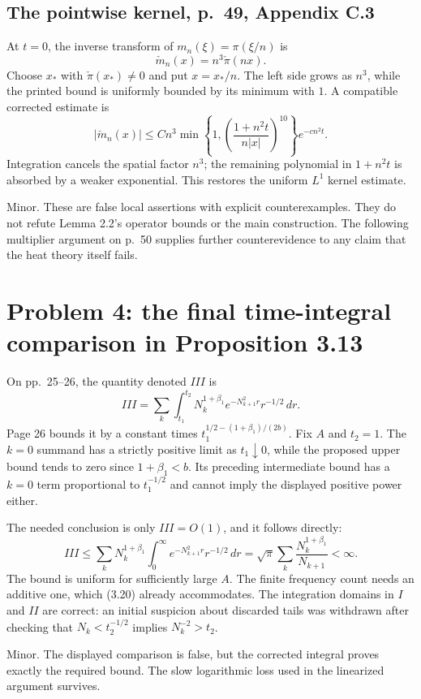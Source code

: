 \documentclass[10pt]{article}
\begin{document}
\subsection*{The pointwise kernel, p. 49, Appendix C.3}
At \(t=0\), the inverse transform of \(m_n(\xi)=\pi(\xi/n)\) is \[\check m_n(x)=n^3\check\pi(nx).\] Choose \(x_*\) with \(\check\pi(x_*)\neq0\) and put \(x=x_*/n\). The left side grows as \(n^3\), while the printed bound is uniformly bounded by its minimum with \(1\). A compatible corrected estimate is \[|\check m_n(x)|
 \leq Cn^3\min\!\left\{1,
       \left(\frac{1+n^2t}{n|x|}\right)^{10}\right\}e^{-cn^2t}.\] Integration cancels the spatial factor \(n^3\); the remaining polynomial in \(1+n^2t\) is absorbed by a weaker exponential. This restores the uniform \(L^1\) kernel estimate.\par
Minor. These are false local assertions with explicit counterexamples. They do not refute Lemma 2.2’s operator bounds or the main construction. The following multiplier argument on p. 50 supplies further counterevidence to any claim that the heat theory itself fails.\par
\section*{Problem 4: the final time-integral comparison in Proposition 3.13}
On pp. 25–26, the quantity denoted \(III\) is \[III=\sum_k\int_{t_1}^{t_2}
          N_k^{1+\beta_1}e^{-N_{k+1}^2r}r^{-1/2}\,dr.\] Page 26 bounds it by a constant times \(t_1^{1/2-(1+\beta_1)/(2b)}\). Fix \(A\) and \(t_2=1\). The \(k=0\) summand has a strictly positive limit as \(t_1\downarrow0\), while the proposed upper bound tends to zero since \(1+\beta_1<b\). Its preceding intermediate bound has a \(k=0\) term proportional to \(t_1^{-1/2}\) and cannot imply the displayed positive power either.\par
The needed conclusion is only \(III=O(1)\), and it follows directly: \[III\leq\sum_kN_k^{1+\beta_1}
                \int_0^\infty e^{-N_{k+1}^2r}r^{-1/2}\,dr
      =\sqrt\pi\sum_k\frac{N_k^{1+\beta_1}}{N_{k+1}}<\infty.\] The bound is uniform for sufficiently large \(A\). The finite frequency count needs an additive one, which (3.20) already accommodates. The integration domains in \(I\) and \(II\) are correct: an initial suspicion about discarded tails was withdrawn after checking that \(N_k<t_2^{-1/2}\) implies \(N_k^{-2}>t_2\).\par
Minor. The displayed comparison is false, but the corrected integral proves exactly the required bound. The slow logarithmic loss used in the linearized argument survives.\par
\end{document}
